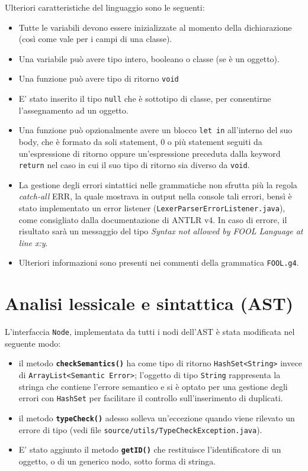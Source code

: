 \documentclass[a4paper]{article}   %
\begin{document}
Ulteriori caratteristiche del linguaggio sono le seguenti:
\begin{itemize}
  \item Tutte le variabili devono essere inizializzate al momento della dichiarazione (così come vale per i campi di una classe).
  \item Una variabile può avere tipo intero, booleano o classe (se è un oggetto).
  \item Una funzione può avere tipo di ritorno \lstinline|void|
  \item E' stato inserito il tipo \lstinline|null| che è sottotipo di classe, per consentirne l'assegnamento ad un oggetto.
  \item Una funzione può opzionalmente avere un blocco \lstinline[language=ANTLR]|let in| all'interno del suo body, che è formato da soli statement, 0 o più statement seguiti da un'espressione di ritorno oppure un'espressione preceduta dalla keyword \lstinline[language=ANTLR]|return| nel caso in cui il suo tipo di ritorno sia diverso da \lstinline|void|.
  \item La gestione degli errori sintattici nelle grammatiche non sfrutta più la regola \textit{catch-all} ERR, la quale mostrava in output nella console tali errori, bensì è stato implementato un error listener (\lstinline|LexerParserErrorListener.java|), come consigliato dalla documentazione di ANTLR v4. In caso di errore, il risultato sarà un messaggio del tipo \textit{Syntax not allowed by FOOL Language at line x:y}.
  \item Ulteriori informazioni sono presenti nei commenti della grammatica \lstinline|FOOL.g4|.
\end{itemize}

\section{Analisi lessicale e sintattica (AST)}
L'interfaccia \lstinline|Node|, implementata da tutti i nodi dell'AST è stata modificata nel seguente modo:\\
\begin{itemize}
  \item il metodo \textbf{\lstinline|checkSemantics()|} ha come tipo di ritorno \lstinline|HashSet<String>| invece di \lstinline|ArrayList<Semantic Error>|; l'oggetto di tipo \lstinline|String| rappresenta la stringa che contiene l'errore semantico e si è optato per una gestione degli errori con \lstinline|HashSet| per facilitare il controllo sull'inserimento di duplicati.
  \item il metodo \textbf{\lstinline|typeCheck()|} adesso solleva un'eccezione quando viene rilevato un errore di tipo (vedi file \lstinline|source/utils/TypeCheckException.java|).
  \item E' stato aggiunto il metodo \textbf{\lstinline|getID()|} che restituisce l'identificatore di un oggetto, o di un generico nodo, sotto forma di stringa.
\end{itemize}
\end{document}
